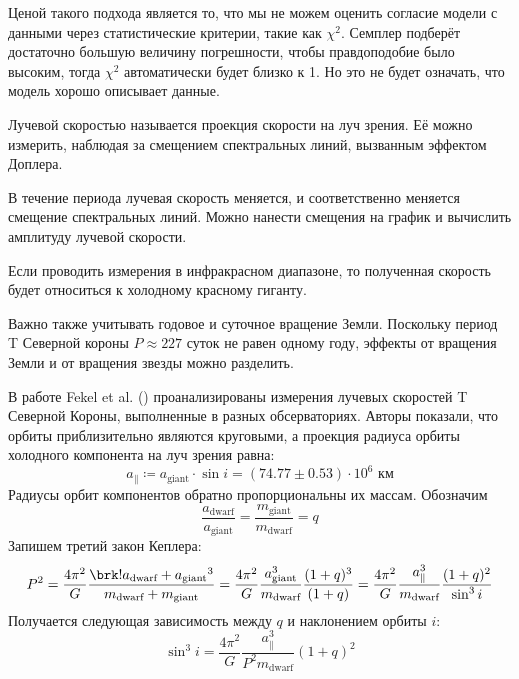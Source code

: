Ценой такого подхода является то, что мы не можем оценить согласие модели с данными через статистические критерии, такие как $\chi^2$. Семплер подберёт достаточно большую величину погрешности, чтобы правдоподобие было высоким, тогда $\chi^2$ автоматически будет близко к 1. Но это не будет означать, что модель хорошо описывает данные.



Лучевой скоростью называется проекция скорости на луч зрения. Её можно измерить, наблюдая за смещением спектральных линий, вызванным эффектом Доплера.

В течение периода лучевая скорость меняется, и соответственно меняется смещение спектральных линий. Можно нанести смещения на график и вычислить амплитуду лучевой скорости.


Если проводить измерения в инфракрасном диапазоне, то полученная скорость будет относиться к холодному красному гиганту.

Важно также учитывать годовое и суточное вращение Земли. Поскольку период T Северной короны $P \approx 227$ суток не равен одному году, эффекты от вращения Земли и от вращения звезды можно разделить.


\label{sect:Chandrasekhar}

В работе Fekel et al. (\citeyear{RadialVelocities}) проанализированы измерения лучевых скоростей T Северной Короны, выполненные в разных обсерваториях. Авторы показали, что орбиты приблизительно являются круговыми, а проекция радиуса орбиты холодного компонента на луч зрения равна:
\[
a_\| \coloneq a_\text{giant} \cdot \sin i = (74.77 \pm 0.53) \cdot 10^6 \text{ км}
\]
%
%
Радиусы орбит компонентов обратно пропорциональны их массам. Обозначим
\[
\frac{a_\text{dwarf}}{a_\text{giant}} = \frac{m_\text{giant}}{m_\text{dwarf}} = q
\]
Запишем третий закон Кеплера:
\[
P^2 = \frac{4\pi^2}{G} \frac{\brk!{a_\text{dwarf} + a_\text{giant}}^3}{m_\text{dwarf} + m_\text{giant}}
= \frac{4\pi^2}{G} \frac{a_\text{giant}^3}{m_\text{dwarf}} \frac{(1 + q)^3}{(1 + q)}
= \frac{4\pi^2}{G} \frac{a_\|^3}{m_\text{dwarf}} \frac{(1 + q)^2}{\sin^3 i}
\]
Получается следующая зависимость между $q$ и наклонением орбиты $i$:
\[
\sin^3 i = \frac{4\pi^2}{G} \frac{a_\|^3}{P^2 m_\text{dwarf}} (1 + q)^2
\]

